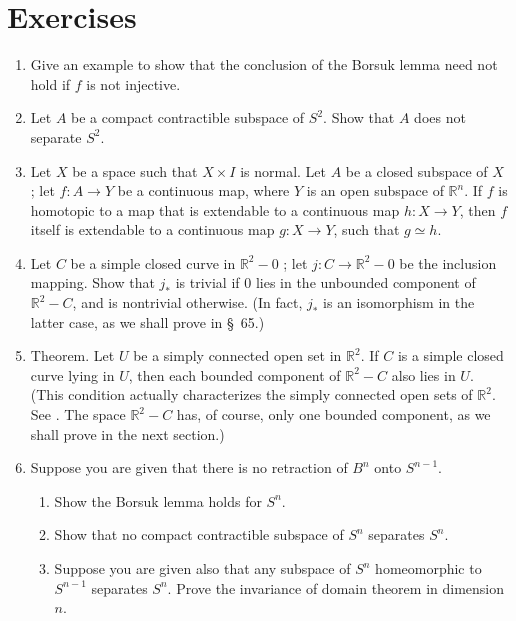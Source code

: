 \section*{Exercises}
\begin{enumerate}[itemsep=0.4em, parsep=0pt, topsep=0pt, partopsep=0pt, leftmargin=*, label=\arabic*., ref=\arabic*]
\item Give an example to show that the conclusion of the Borsuk lemma need not hold if \(f\) is not injective.
\item Let \(A\) be a compact contractible subspace of \(S^{2}\). Show that \(A\) does not separate \(S^{2}\).
\item Let \(X\) be a space such that \(X \times I\) is normal. Let \(A\) be a closed subspace of \(X\) ; let \(f : A \rightarrow Y\) be a continuous map, where \(Y\) is an open subspace of \(\mathbb{R}^{n}\). If \(f\) is homotopic to a map that is extendable to a continuous map \(h : X \rightarrow Y\), then \(f\) itself is extendable to a continuous map \(g : X \rightarrow Y\), such that \(g \simeq h\).
\item Let \(C\) be a simple closed curve in \(\mathbb{R}^{2} - 0\) ; let \(j : C \rightarrow {\mathbb{R}}^{2} - 0\) be the inclusion mapping. Show that \(j_{ * }\) is trivial if 0 lies in the unbounded component of \(\mathbb{R}^{2} - C\), and is nontrivial otherwise. (In fact, \(j_{ * }\) is an isomorphism in the latter case, as we shall prove in \S\ 65.)
\item Theorem. Let \(U\) be a simply connected open set in \(\mathbb{R}^{2}\). If \(C\) is a simple closed curve lying in \(U\), then each bounded component of \(\mathbb{R}^{2} - C\) also lies in \(U\). (This condition actually characterizes the simply connected open sets of \(\mathbb{R}^{2}\). See \cite{Rudin1987}. The space \(\mathbb{R}^{2} - C\) has, of course, only one bounded component, as we shall prove in the next section.)
\item Suppose you are given that there is no retraction of \(B^{n}\) onto \(S^{n - 1}\).
 \begin{enumerate}[itemsep=0.2em, parsep=0pt, topsep=0pt, partopsep=0pt, leftmargin=*, label=(\alph*), align=left]
 \item Show the Borsuk lemma holds for \(S^{n}\).
 \item Show that no compact contractible subspace of \(S^{n}\) separates \(S^{n}\).
 \item Suppose you are given also that any subspace of \(S^{n}\) homeomorphic to \(S^{n - 1}\) separates \(S^{n}\). Prove the invariance of domain theorem in dimension \(n\).
 \end{enumerate}
\end{enumerate}

